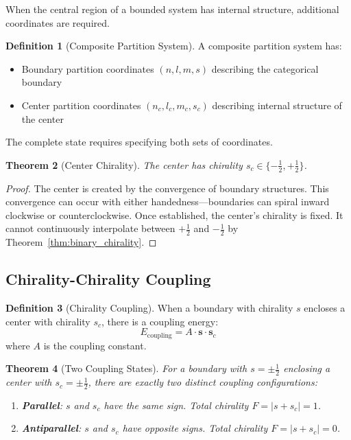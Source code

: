 \documentclass[twocolumn,10pt,a4paper]{article}
\newtheorem{theorem}{Theorem}[section]
\theoremstyle{definition}
\newtheorem{definition}[theorem]{Definition}
\theoremstyle{remark}
\begin{document}
When the central region of a bounded system has internal structure, additional coordinates are required.

\begin{definition}[Composite Partition System]
A composite partition system has:
\begin{itemize}
    \item Boundary partition coordinates $(n, l, m, s)$ describing the categorical boundary
    \item Center partition coordinates $(n_c, l_c, m_c, s_c)$ describing internal structure of the center
\end{itemize}
The complete state requires specifying both sets of coordinates.
\end{definition}

\begin{theorem}[Center Chirality]
\label{thm:center_chirality}
The center has chirality $s_c \in \{-\frac{1}{2}, +\frac{1}{2}\}$.
\end{theorem}

\begin{proof}
The center is created by the convergence of boundary structures. This convergence can occur with either handedness---boundaries can spiral inward clockwise or counterclockwise. Once established, the center's chirality is fixed. It cannot continuously interpolate between $+\frac{1}{2}$ and $-\frac{1}{2}$ by Theorem~\ref{thm:binary_chirality}.
\end{proof}

\subsection{Chirality-Chirality Coupling}

\begin{definition}[Chirality Coupling]
When a boundary with chirality $s$ encloses a center with chirality $s_c$, there is a coupling energy:
\begin{equation}
    E_{\text{coupling}} = A \cdot \mathbf{s} \cdot \mathbf{s}_c
\end{equation}
where $A$ is the coupling constant.
\end{definition}

\begin{theorem}[Two Coupling States]
\label{thm:coupling_states}
For a boundary with $s = \pm\frac{1}{2}$ enclosing a center with $s_c = \pm\frac{1}{2}$, there are exactly two distinct coupling configurations:
\begin{enumerate}
    \item \textbf{Parallel}: $s$ and $s_c$ have the same sign. Total chirality $F = |s + s_c| = 1$.
    \item \textbf{Antiparallel}: $s$ and $s_c$ have opposite signs. Total chirality $F = |s + s_c| = 0$.
\end{enumerate}
\end{theorem}
\end{document}
